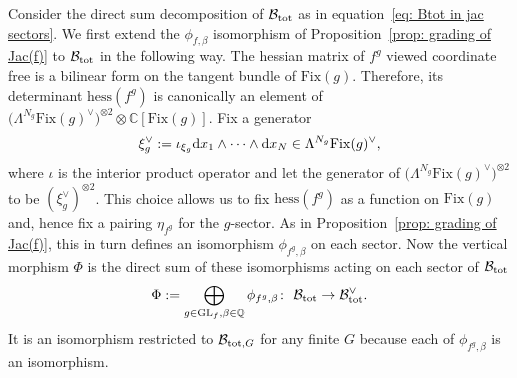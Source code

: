 \documentclass[pdftex]{sigma}
\numberwithin{equation}{section}
\newcommand{\QQ}{{\mathbb{Q}}}
\newcommand{\GL}{{\mathrm{GL}}}
\newcommand{\Fix}{\mathrm{Fix}}
\newcommand{\hess}{\mathrm{hess}}
\def\B{{\mathcal B}}
\newcommand\iot{\iota}
\begin{document}
Consider the direct sum decomposition of $\B_{\rm tot}$ as in equation~\eqref{eq: Btot in jac sectors}. We first extend the $\phi_{f,\beta}$ isomorphism of Proposition~\ref{prop: grading of Jac(f)} to $\B_{\rm tot}$ in the following way. The hessian matrix of $f^g$ viewed coordinate free is a bilinear form on the tangent bundle of $\Fix(g)$. Therefore, its determinant $\hess(f^g)$ is canonically an element of $\bigl(\Lambda^{N_g} \Fix(g)^\vee\bigr)^{\otimes 2}\otimes \mathbb{C}[\Fix(g)]$. Fix a generator \[\xi^\vee_g:=\iot_{\xi_g}{\rm d}x_1\wedge\cdots\wedge {\rm d}x_N\in\Lambda^{N_g} \Fix(g)^\vee,\] where $\iot$ is the interior product operator and let the generator of $\bigl(\Lambda^{N_g}\Fix(g)^\vee\bigr)^{\otimes 2}$ to be $(\xi^\vee_g)^{\otimes 2}$. This choice allows us to fix $\hess(f^g)$ as a function on $\Fix(g)$ and, hence fix a pairing $\eta_{f^g}$ for the $g$-sector. As in Proposition~\ref{prop: grading of Jac(f)}, this in turn defines an isomorphism $\phi_{f^g,\beta}$ on each sector.
Now the vertical morphism $\Phi$ is the direct sum of these isomorphisms acting on each sector of $\B_{\rm tot}$
\[
	\Phi := \bigoplus_{g \in \GL_f,\beta\in\QQ} \phi_{f^g,\beta} \colon \ \B_{\rm tot}\to \B_{\rm tot}^\vee.
\]
It is an isomorphism restricted to $\B_{{\rm tot},G}$ for any finite $G$ because each of $\phi_{f^g,\beta}$ is an isomorphism.
\end{document}
